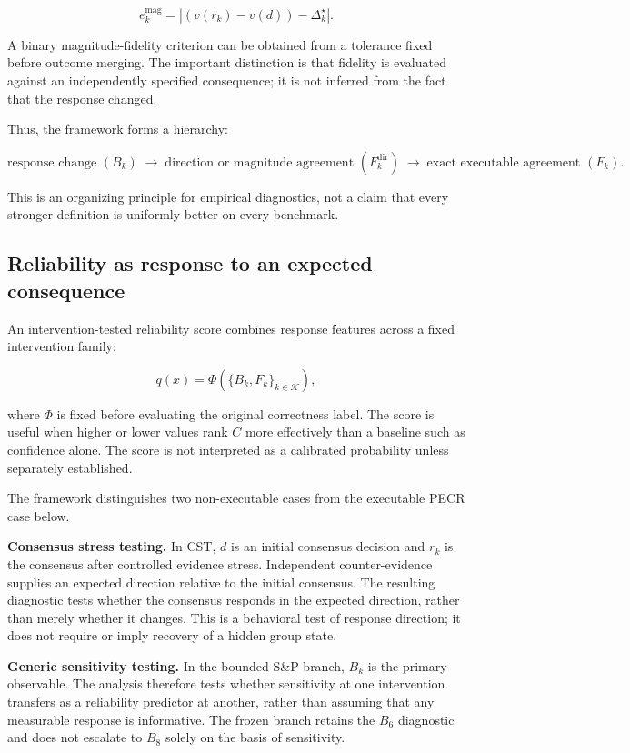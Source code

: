 \documentclass[11pt]{article}
\begin{document}
\[
e_k^{\mathrm{mag}}
=
\left|
\left(v(r_k)-v(d)\right)-\Delta_k^\star
\right|.
\]

A binary magnitude-fidelity criterion can be obtained from a tolerance fixed before outcome merging. The important distinction is that fidelity is evaluated against an independently specified consequence; it is not inferred from the fact that the response changed.

Thus, the framework forms a hierarchy:

\[
\text{response change }(B_k)
\;\longrightarrow\;
\text{direction or magnitude agreement }(F_k^{\mathrm{dir}})
\;\longrightarrow\;
\text{exact executable agreement }(F_k).
\]

This is an organizing principle for empirical diagnostics, not a claim that every stronger definition is uniformly better on every benchmark.

\subsection{Reliability as response to an expected consequence}

An intervention-tested reliability score combines response features across a fixed intervention family:

\[
q(x)=\Phi\left(\{B_k,F_k\}_{k\in\mathcal{K}}\right),
\]

where \(\Phi\) is fixed before evaluating the original correctness label. The score is useful when higher or lower values rank \(C\) more effectively than a baseline such as confidence alone. The score is not interpreted as a calibrated probability unless separately established.

The framework distinguishes two non-executable cases from the executable PECR case below.

\textbf{Consensus stress testing.} In CST, \(d\) is an initial consensus decision and \(r_k\) is the consensus after controlled evidence stress. Independent counter-evidence supplies an expected direction relative to the initial consensus. The resulting diagnostic tests whether the consensus responds in the expected direction, rather than merely whether it changes. This is a behavioral test of response direction; it does not require or imply recovery of a hidden group state.

\textbf{Generic sensitivity testing.} In the bounded S\&P branch, \(B_k\) is the primary observable. The analysis therefore tests whether sensitivity at one intervention transfers as a reliability predictor at another, rather than assuming that any measurable response is informative. The frozen branch retains the \(B_6\) diagnostic and does not escalate to \(B_8\) solely on the basis of sensitivity.
\end{document}
